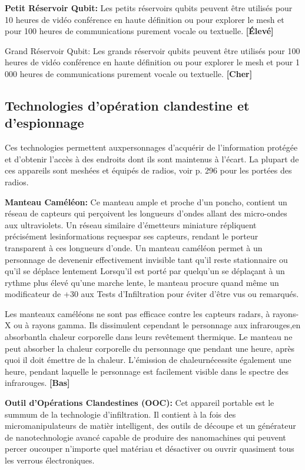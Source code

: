 \textbf{Petit Réservoir Qubit:} Les petits réservoirs qubits peuvent être utilisés pour 10 heures de vidéo conférence en haute définition ou pour explorer le mesh et pour 100 heures de communications purement vocale ou textuelle. \textbf{[Élevé]} 

Grand Réservoir Qubit: Les grands réservoir qubits peuvent être utilisés pour 100 heures de vidéo conférence en haute définition ou pour explorer le mesh et pour 1 000 heures de communications purement vocale ou textuelle. \textbf{[Cher]} 

\subsection{Technologies d'opération clandestine et d'espionnage} \label{sec:covert-espionage-tech} 

Ces technologies permettent auxpersonnages d'acquérir de l'information protégée et d'obtenir l'accès à des endroits dont ils sont maintenus à l'écart. La plupart de ces appareils sont meshées et équipés de radios, voir p. 296 pour les portées des radios. 

\textbf{Manteau Caméléon:} Ce manteau ample et proche d'un poncho, contient un réseau de capteurs qui perçoivent les longueurs d'ondes allant des micro-ondes aux ultraviolets. Un réseau similaire d'émetteurs miniature répliquent précisément lesinformations reçuespar ses capteurs, rendant le porteur transparent à ces longueurs d'onde. Un manteau caméléon permet à un personnage de devenenir effectivement invisible tant qu'il reste stationnaire ou qu'il se déplace lentement Lorsqu'il est porté par quelqu'un se déplaçant à un rythme plus élevé qu'une marche lente, le manteau procure quand même un modificateur de +30 aux Tests d'Infiltration pour éviter d'être vus ou remarqués. 

Les manteaux caméléons ne sont pas efficace contre les capteurs radars, à rayons-X ou à rayons gamma. Ils dissimulent cependant le personnage aux infrarouges,en absorbantla chaleur corporelle dans leurs revêtement thermique. Le manteau ne peut absorber la chaleur corporelle du personnage que pendant une heure, après quoi il doit émettre de la chaleur. L'émission de chaleurnécessite également une heure, pendant laquelle le personnage est facilement visible dans le spectre des infrarouges. \textbf{[Bas]} 

\textbf{Outil d'Opérations Clandestines (OOC):} Cet appareil portable est le summum de la technologie d'infiltration. Il contient à la fois des micromanipulateurs de matièr intelligent, des outils de découpe et un générateur de nanotechnologie avancé capable de produire des nanomachines qui peuvent percer oucouper n'importe quel matériau et désactiver ou ouvrir quasiment tous les verrous électroniques. 

